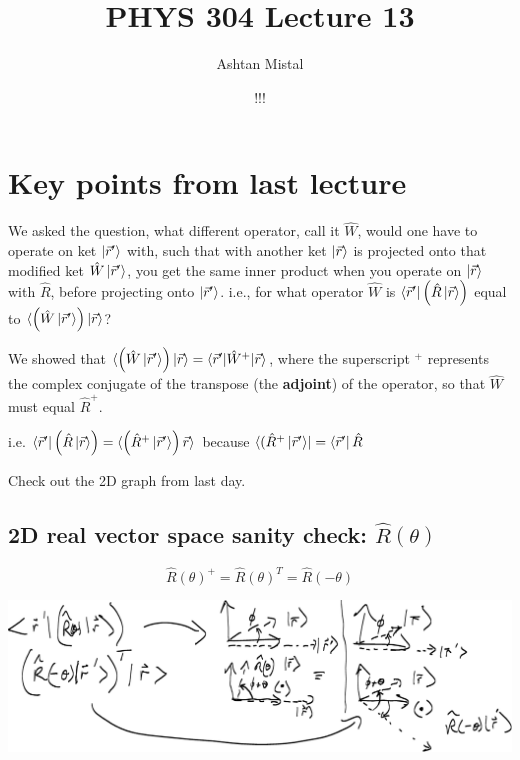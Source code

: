 \documentclass{article}
\title{PHYS 304 Lecture 13}
\author{Ashtan Mistal}
\date{!!!}
\begin{document}
\ifstandalone
\maketitle
\fi

\graphicspath{{./Lecture13/}}

\section{Key points from last lecture}

We asked the question, what different operator, call it $\hat{W}$, would one have to operate on ket $\ket{\vec{r}'}$ with, such that with another ket $\ket{\vec{r}}$ is projected onto that modified ket $\hat{W} \ket{\vec{r}'}$, you get the same inner product when you operate on $\ket{\vec{r}}$ with $\hat{R}$, before projecting onto $\ket{\vec{r}'}$. i.e., for what operator $\hat{W}$ is $\bra{\vec{r}'} \left( \hat{R} \ket{\vec{r}} \right)$ equal to $\braket{ \left( \hat{W} \ket{\vec{r}'} \right) | \vec{r}}$?

We showed that $\braket{ \left( \hat{W} \ket{\vec{r}'} \right) | \vec{r}} = \braket{\vec{r}'|\hat{W}^+|\vec{r}}$, where the superscript $^+$ represents the complex conjugate of the transpose (the \textbf{adjoint}) of the operator, so that $\hat{W}$ must equal $\hat{R}^+$.

i.e. $\bra{\vec{r}'} \left( \hat{R} \ket{\vec r} \right) = \braket{ \left( \hat{R}^+ \ket{\vec{r}'} \right) \vec{r}}$ because $\bra{(\hat{R}^+ \ket{\vec{r}'}} = \bra{\vec{r}'}\hat{R}$

Check out the 2D graph from last day. 

\subsection*{2D real vector space sanity check: $\hat{R}(\theta)$}

$$\hat{R} (\theta)^+ = \hat{R} (\theta)^T = \hat{R}(- \theta)$$


\includegraphics[width = \textwidth]{Lecture13/1.png}
\end{document}

